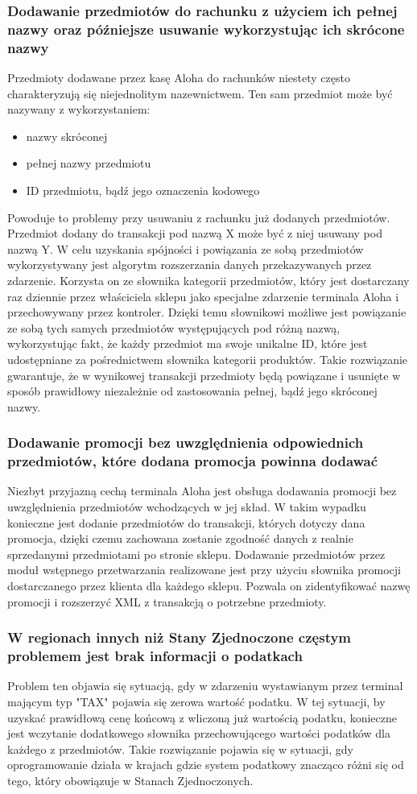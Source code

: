 \documentclass[a4paper]{book}
\begin{document}
\subsubsection{Dodawanie przedmiotów do rachunku z użyciem ich pełnej nazwy oraz późniejsze usuwanie wykorzystując ich skrócone nazwy}
Przedmioty dodawane przez kasę Aloha do rachunków niestety często charakteryzują się niejednolitym nazewnictwem. Ten sam przedmiot może być nazywany z wykorzystaniem:
 \begin{itemize}
	\item nazwy skróconej
	\item pełnej nazwy przedmiotu
	\item ID przedmiotu, bądź jego oznaczenia kodowego
\end{itemize}
Powoduje to problemy przy usuwaniu z rachunku już dodanych przedmiotów. Przedmiot dodany do transakcji pod nazwą X może być z niej usuwany pod nazwą Y. W celu uzyskania spójności i powiązania ze sobą przedmiotów wykorzystywany jest algorytm rozszerzania danych przekazywanych przez zdarzenie. Korzysta on ze słownika kategorii przedmiotów, który jest dostarczany raz dziennie przez właściciela sklepu jako specjalne zdarzenie terminala Aloha i przechowywany przez kontroler. Dzięki temu słownikowi możliwe jest powiązanie ze sobą tych samych przedmiotów występujących pod różną nazwą, wykorzystując fakt, że każdy przedmiot ma swoje unikalne ID, które jest udostępniane za pośrednictwem słownika kategorii produktów. Takie rozwiązanie gwarantuje, że w wynikowej transakcji przedmioty będą powiązane i usunięte w sposób prawidłowy niezależnie od zastosowania pełnej, bądź jego skróconej nazwy.
\subsubsection{Dodawanie promocji bez uwzględnienia odpowiednich przedmiotów, które dodana promocja powinna dodawać}
Niezbyt przyjazną cechą terminala Aloha jest obsługa dodawania promocji bez uwzględnienia przedmiotów wchodzących w jej skład. W takim wypadku konieczne jest dodanie przedmiotów do transakcji, których dotyczy dana promocja, dzięki czemu zachowana zostanie zgodność danych z realnie sprzedanymi przedmiotami po stronie sklepu. Dodawanie przedmiotów przez moduł wstępnego przetwarzania realizowane jest przy użyciu słownika promocji dostarczanego przez klienta dla każdego sklepu. Pozwala on zidentyfikować nazwę promocji i rozszerzyć XML z transakcją o potrzebne przedmioty. 
\subsubsection{W regionach innych niż Stany Zjednoczone częstym problemem jest brak informacji o podatkach}
Problem ten objawia się sytuacją, gdy w zdarzeniu wystawianym przez terminal mającym typ "TAX" pojawia się zerowa wartość podatku. W tej sytuacji, by uzyskać prawidłową cenę końcową z wliczoną już wartością podatku, konieczne jest wczytanie dodatkowego słownika przechowującego wartości podatków dla każdego z przedmiotów. Takie rozwiązanie pojawia się w sytuacji, gdy oprogramowanie działa w krajach gdzie system podatkowy znacząco różni się od tego, który obowiązuje w Stanach Zjednoczonych. 
\end{document}
